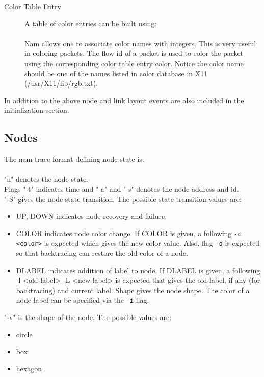 \begin{description}
\item[Color Table Entry]
A table of color entries can be built using:\\
\\
Nam allows one to associate color names with
integers. This is very useful in coloring packets. The flow id of
a packet is used to color the packet using the corresponding color
table entry color.
Notice the color name should be one of the names
listed in color database in X11 (/usr/X11/lib/rgb.txt). 

\end{description}

In addition to the above node and link layout events are also included in the initialization section.

\subsection{Nodes}

The nam trace format defining node state is:\\
\\
"n" denotes the node state.\\
Flags "-t" indicates time and "-a" and "-s" denotes the node address and id.\\
"-S" gives the node state transition. The possible state transition values are: 
\begin{itemize}
\item UP, DOWN indicates node recovery and failure.
\item COLOR indicates node color change. If COLOR is given, a
  following {\tt -c <color>} is expected which gives the new color
  value. Also, flag {\tt -o} is expected so that backtracing can
  restore the old color of a node. 
\item DLABEL indicates addition of label to node. If DLABEL is
  given, a following -l <old-label> -L <new-label> is expected that gives
  the old-label, if any (for backtracing) and current label. Shape gives
  the node shape. The color of a node label can be specified via the
  {\tt -i} flag. 
\end{itemize}

"-v" is the shape of the node. The possible values are:
\begin{itemize}
\item circle
\item box
\item hexagon
\end{itemize}

